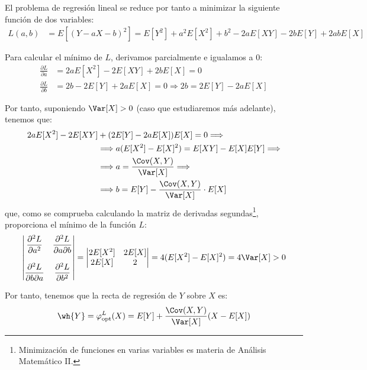 El problema de regresión lineal se reduce por tanto a minimizar la siguiente función de dos variables:
\begin{align*}
    L(a,b) &= E[(Y - aX - b)^2]
    = E[Y^2] + a^2E[X^2] + b^2 - 2aE[XY] - 2bE[Y] + 2abE[X]
\end{align*}

Para calcular el mínimo de $L$, derivamos parcialmente e igualamos a 0:
\begin{align*}
    \frac{\partial L}{\partial a} &= 2aE[X^2] - 2E[XY] + 2bE[X] = 0\\
    \frac{\partial L}{\partial b} &= 2b - 2E[Y] + 2aE[X] = 0 \Longrightarrow
    2b = 2E[Y] - 2aE[X]
\end{align*}

Por tanto, suponiendo $\Var[X]> 0$ (caso que estudiaremos más adelante), tenemos que:
\begin{align*}
    2aE[X^2] - 2E[XY] &+ (2E[Y] - 2aE[X])E[X] = 0
    \Longrightarrow  \\ &\Longrightarrow
    a(E[X^2] - E[X]^2) = E[XY] - E[X]E[Y]
    \Longrightarrow \\ &\Longrightarrow
    a = \dfrac{\Cov(X,Y)}{\Var[X]}
    \Longrightarrow  \\ &\Longrightarrow
    b = E[Y] - \dfrac{\Cov(X,Y)}{\Var[X]} \cdot E[X]
\end{align*}
que, como se comprueba calculando la matriz de derivadas segundas\footnote{Minimización de funciones en varias variables es materia de Análisis Matemático II.}, proporciona el mínimo de la función $L$:
\begin{equation*}
    \begin{vmatrix}
        \dfrac{\partial^2 L}{\partial a^2} & \dfrac{\partial^2 L}{\partial a\partial b}\\ \\
        \dfrac{\partial^2 L}{\partial b\partial a} & \dfrac{\partial^2 L}{\partial b^2}
    \end{vmatrix} =
    \begin{vmatrix}
        2E[X^2] & 2E[X]\\
        2E[X] & 2
    \end{vmatrix} = 4(E[X^2] - E[X]^2) = 4\Var[X] > 0
\end{equation*}

Por tanto, tenemos que la recta de regresión de $Y$ sobre $X$ es:
\begin{equation*}
    \wh{Y}=\varphi_{\text{opt}}^L(X) = E[Y] + \dfrac{\Cov(X,Y)}{\Var[X]}(X - E[X])
\end{equation*}

